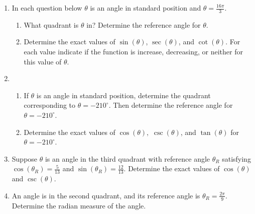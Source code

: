 \begin{enumerate}
\item In each question below  $\theta$ is an angle in standard
  position and  $\theta=\frac{16\pi}{3}$. 
  \begin{enumerate}
  \item What quadrant is $\theta$ in?  Determine the reference angle
    for $\theta$.
    \vfill
    \vfill

  \item Determine the exact values of $\sin(\theta)$, $\sec(\theta)$,
    and $\cot(\theta)$. For each value indicate if the function is
    increase, decreasing, or neither for this value of $\theta$.
    \vfill \vfill \vfill \vfill
\end{enumerate}

\clearpage
\item \begin{enumerate}
  \item If $\theta$ is an angle in standard position, determine the
    quadrant corresponding to $\theta=-210^\circ$. Then determine the
    reference angle for $\theta=-210^\circ$.

    \vfill

  \item Determine the exact values of $\cos(\theta),$ $\csc(\theta)$,
    and $\tan(\theta)$ for $\theta=-210^\circ$.

    \vfill
    
\end{enumerate}








\item Suppose $\theta$ is an angle in the third quadrant with
  reference angle $\theta_R$ satisfying $\cos(\theta_R)=\frac{5}{13}$
  and $\sin(\theta_R)=\frac{12}{13}$.  Determine the exact values of
  $\cos(\theta)$ and $\csc(\theta)$.

  \vfill
  \vfill
  \vfill

\item An angle is in the second quadrant, and its reference angle is
  $\theta_R=\frac{2\pi}{9}$. Determine the radian measure of the
  angle.

  \vfill

\end{enumerate}




